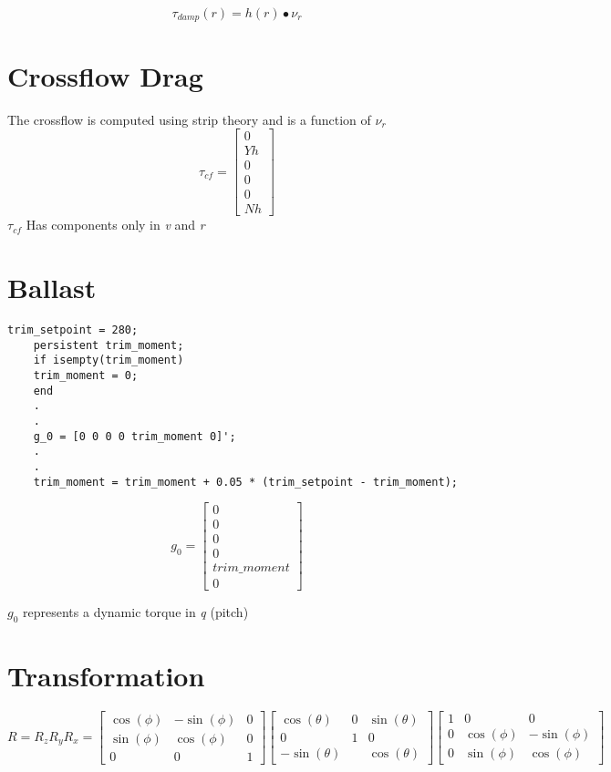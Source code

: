 \documentclass[12pt,a4]{article}
\begin{document}
\begin{equation}
	\tau_{damp}(r) = h(r) \bullet \nu_r
\end{equation}

\section{Crossflow Drag}
The crossflow is computed using strip theory and is a function of $\nu_r$
\begin{equation}
	\tau_{cf} =
	\begin{bmatrix}0\\Yh\\0\\0\\0\\Nh\end{bmatrix}
\end{equation}
$\tau_{cf}$ Has components only in \textit{v} and \textit{r}

\section{Ballast}
\begin{lstlisting}[frame=single]
	trim_setpoint = 280;
	persistent trim_moment;
	if isempty(trim_moment)
	trim_moment = 0;
	end
	.
	.
	g_0 = [0 0 0 0 trim_moment 0]';
	.
	.
	trim_moment = trim_moment + 0.05 * (trim_setpoint - trim_moment);
\end{lstlisting}

\begin{equation}
	g_0 =
	\begin{bmatrix}0\\0\\0\\0\\trim\_moment\\0\end{bmatrix}
\end{equation}

$g_0$ represents a dynamic torque in \textit{q} (pitch)

\section{Transformation}
\begin{equation}
	R = R_z R_y R_x =
	\begin{bmatrix}
		\cos(\phi) & -\sin(\phi) & 0 \\
		\sin(\phi) & \cos(\phi)  & 0 \\
		0          & 0           & 1
	\end{bmatrix}
	\begin{bmatrix}
		\cos(\theta)  & 0 & \sin(\theta) \\
		0             & 1 & 0            \\
		-\sin(\theta) &   & \cos(\theta)
	\end{bmatrix}
	\begin{bmatrix}
		1 & 0          & 0           \\
		0 & \cos(\phi) & -\sin(\phi) \\
		0 & \sin(\phi) & \cos(\phi)
	\end{bmatrix}
\end{equation}
\end{document}
